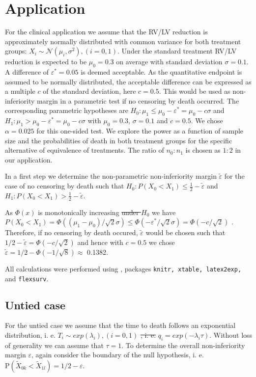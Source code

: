 \documentclass[bimj,fleqn]{w-art}\usepackage[]{graphicx}\usepackage[]{color}
\theoremstyle{plain}
\theoremstyle{definition}
\providecommand{\DIFadd}[1]{{\protect\color{blue}\uwave{#1}}} %
\providecommand{\DIFdel}[1]{{\protect\color{red}\sout{#1}}}                      %
\providecommand{\DIFaddbegin}{} %
\providecommand{\DIFaddend}{} %
\providecommand{\DIFdelbegin}{} %
\providecommand{\DIFdelend}{} %
\newcommand{\DIFscaledelfig}{0.5}
\newlength{\DIFdelgraphicswidth} %
\newlength{\DIFdelgraphicsheight} %
\newcommand{\DIFaddincludegraphics}[2][]{{\color{blue}\fbox{\DIFOincludegraphics[#1]{#2}}}} %
\newcommand{\DIFdelincludegraphics}[2][]{%
\sbox{\DIFdelgraphicsbox}{\DIFOincludegraphics[#1]{#2}}%
\settoboxwidth{\DIFdelgraphicswidth}{\DIFdelgraphicsbox} %
\settoboxtotalheight{\DIFdelgraphicsheight}{\DIFdelgraphicsbox} %
\scalebox{\DIFscaledelfig}{%
\parbox[b]{\DIFdelgraphicswidth}{\usebox{\DIFdelgraphicsbox}\\[-\baselineskip] \rule{\DIFdelgraphicswidth}{0em}}\llap{\resizebox{\DIFdelgraphicswidth}{\DIFdelgraphicsheight}{%
\setlength{\unitlength}{\DIFdelgraphicswidth}%
\begin{picture}(1,1)%
\thicklines\linethickness{2pt} %
{\color[rgb]{1,0,0}\put(0,0){\framebox(1,1){}}}%
{\color[rgb]{1,0,0}\put(0,0){\line( 1,1){1}}}%
{\color[rgb]{1,0,0}\put(0,1){\line(1,-1){1}}}%
\end{picture}%
}\hspace*{3pt}}} %
} %
\DeclareRobustCommand{\DIFaddbegin}{\DIFOaddbegin \let\includegraphics\DIFaddincludegraphics} %
\DeclareRobustCommand{\DIFaddend}{\DIFOaddend \let\includegraphics\DIFOincludegraphics} %
\DeclareRobustCommand{\DIFdelbegin}{\DIFOdelbegin \let\includegraphics\DIFdelincludegraphics} %
\DeclareRobustCommand{\DIFdelend}{\DIFOaddend \let\includegraphics\DIFOincludegraphics} %
\begin{document}
\section{Application}
\label{sec:Application}
For the clinical application we assume that the RV/LV reduction is approximately
normally distributed with common variance for both treatment groups:
$X_i \sim \mathcal{N} ( \mu_i, \sigma^2 ), (i = 0, 1)$. Under the standard
treatment RV/LV reduction is expected to be $\mu_0 = 0.3$ on average with
standard deviation $\sigma= 0.1$. A difference of $\varepsilon^{*} = 0.05$ is
deemed acceptable. As the quantitative endpoint is assumed to be normally
distributed, the acceptable difference can be expressed as a multiple $c$
of the standard deviation, here $c = 0.5$. This would be used as non-inferiority
margin in a parametric test if no censoring by death occurred. The corresponding
parametric hypotheses are
$H_0: \mu_1 \leq \mu_0 - \varepsilon^{*}  = \mu_0 - c \sigma $ and
$H_1: \mu_1 > \mu_0 - \varepsilon^{*} = \mu_0 - c \sigma $ with $\mu_0 = 0.3$,
$\sigma = 0.1$ and $c = 0.5$. We chose $\alpha = 0.025$ for this one-sided test.
We explore the power as a function of sample size and the probabilities of death
in both treatment groups for the specific alternative of equivalence of
treatments. The ratio of $n_0 : n_1$ is chosen as $1 : 2 $ in our application.

In a first step we determine the non-parametric non-inferiority margin $\tilde{\varepsilon}$
for the case of no censoring by death such that
$H_0: P(X_0 < X_1) \leq \frac{1}{2} - \tilde{\varepsilon}$ and
$H_1: P(X_0 < X_1) >  \frac{1}{2} - \tilde{\varepsilon}$.

As $\Phi(x)$ is monotonically increasing \DIFdelbegin \DIFdel{under $H_0$ }\DIFdelend we have
$P(X_0 < X_1) = \Phi((\mu_1 - \mu_0)/\sqrt{2}\sigma) \leq
\Phi(- \varepsilon^{*}/ \sqrt{2}\sigma) = \Phi(-c/\sqrt{2}) $ \DIFaddbegin \DIFadd{under $H_0$ }\DIFaddend .
Therefore, if no censoring by death occured, $\tilde{\varepsilon}$ would be
chosen such that $1/2 - \tilde{\varepsilon} = \Phi(- c/\sqrt{2}) $ and hence
with $c = 0.5$ we chose  $\tilde{\varepsilon} = 1/2 - \Phi(- 1/\sqrt{8})
\approx $ 0.1382.

All calculations were performed using
\DIFdelbegin %
\DIFdelend \DIFaddbegin \DIFadd{R version 3.5.0 (2018-04-23)}\DIFaddend ,
packages {\tt{knitr, xtable, latex2exp, }} and {\tt{flexsurv}}.

\subsection{Untied case}
\label{sec:AppUntied}
For the untied case we assume that the time to death follows an exponential
distribution, i. e. $T_i \sim exp(\lambda_i), (i=0,1)$ \DIFdelbegin \DIFdel{, i. e. }\DIFdelend \DIFaddbegin \DIFadd{and hence
}\DIFaddend $q_i = exp(-\lambda_i \tau)$. Without loss of generality we can assume that
$\tau = 1$. To determine the overall non-inferiority margin $\varepsilon$, again
consider the boundary of the null hypothesis, i. e.
$\text{P}(\widetilde{X}_{0k} < \widetilde{X}_{1l}) = 1/2 - \varepsilon $.
\end{document}
